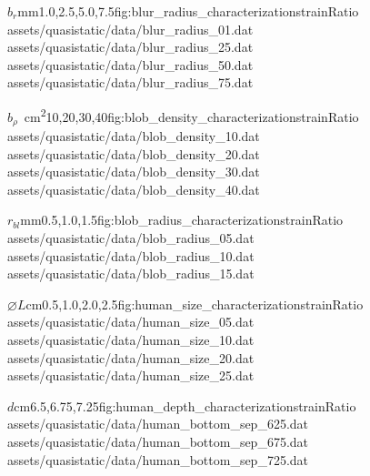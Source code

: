 \begin{multicols}{2}
			\characterizationDataTable%
				{$b_r$}{mm}{1.0,2.5,5.0,7.5}{fig:blur_radius_characterization}{strainRatio}%
				{assets/quasistatic/data/blur_radius_01.dat}%
				{assets/quasistatic/data/blur_radius_25.dat}%
				{assets/quasistatic/data/blur_radius_50.dat}%
				{assets/quasistatic/data/blur_radius_75.dat}

			\characterizationDataTable%
				{$b_\rho$}{\si{\per\cm\squared}}{10,20,30,40}{fig:blob_density_characterization}{strainRatio}%
				{assets/quasistatic/data/blob_density_10.dat}%
				{assets/quasistatic/data/blob_density_20.dat}%
				{assets/quasistatic/data/blob_density_30.dat}%
				{assets/quasistatic/data/blob_density_40.dat}

			\characterizationDataTable%
				{$r_{bl}$}{mm}{0.5,1.0,1.5}{fig:blob_radius_characterization}{strainRatio}%
				{assets/quasistatic/data/blob_radius_05.dat}%
				{assets/quasistatic/data/blob_radius_10.dat}%
				{assets/quasistatic/data/blob_radius_15.dat}%
				{}

			\characterizationDataTable%
				{$\diameter L$}{cm}{0.5,1.0,2.0,2.5}{fig:human_size_characterization}{strainRatio}%
				{assets/quasistatic/data/human_size_05.dat}%
				{assets/quasistatic/data/human_size_10.dat}%
				{assets/quasistatic/data/human_size_20.dat}%
				{assets/quasistatic/data/human_size_25.dat}

			\characterizationDataTable%
				{$d$}{cm}{6.5,6.75,7.25}{fig:human_depth_characterization}{strainRatio}%
				{assets/quasistatic/data/human_bottom_sep_625.dat}%
				{assets/quasistatic/data/human_bottom_sep_675.dat}%
				{assets/quasistatic/data/human_bottom_sep_725.dat}%
				{}
		\end{multicols}

